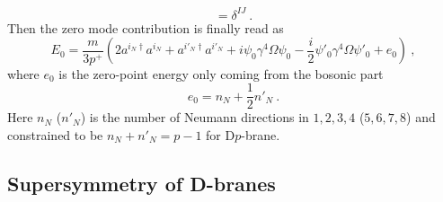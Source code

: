 \documentclass[a4paper,12pt]{article}
\begin{document}
\begin{equation}
[ a^I, a^{J \dagger} ] = \delta^{IJ} ~.
\end{equation}
Then the zero mode contribution is finally read as
\begin{equation}
E_0 = \frac{m}{3 p^+} 
   \left(
      2 a^{i_N \dagger} a^{i_N} 
     + a^{i'_N \dagger} a^{i'_N}     
     + i \psi_0 \gamma^4 \Omega \psi_0 
     - \frac{i}{2} \psi'_0 \gamma^4 \Omega \psi'_0
     + e_0 
   \right) ~,
\label{ozm}
\end{equation}
where $e_0$ is the zero-point energy only coming from the bosonic
part
\begin{equation}
e_0 = n_N + \frac{1}{2} n'_N ~.
\label{zpe}
\end{equation}
Here $n_N$ ($n'_N$) is the number of Neumann directions in $1,2,3,4$
($5,6,7,8$) and constrained to be $n_N + n'_N = p-1$ for D$p$-brane.


\subsection{Supersymmetry of D-branes}
\end{document}
